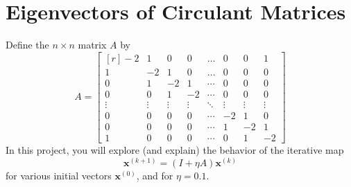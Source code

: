 \section{Eigenvectors of Circulant Matrices}


Define the $n \times n$ matrix $A$ by
\begin{equation}
A = \begin{bmatrix*}[r] -2 & 1 & 0 & 0 & \dots & 0 & 0 & 1 \\ 1 & -2 & 1 & 0 & \dots& 0 & 0 & 0 \\ 0 & 1 & -2 & 1 & \cdots&0 & 0 & 0 \\ 0 & 0 & 1 & -2 & \cdots&0 & 0 & 0 \\ \vdots & \vdots & \vdots & \vdots & \ddots & \vdots & \vdots & \vdots \\ 0 & 0 & 0 & 0 & \cdots & -2 & 1 & 0 \\ 0 & 0 & 0 & 0 & \cdots & 1 & -2 & 1\\ 1 & 0 & 0 & 0 & \cdots & 0 & 1 & -2 \end{bmatrix*}
\end{equation}
In this project, you will explore (and explain) the behavior of the iterative map
    \begin{equation}
      \label{eq:eigen-iterative}
      \bm{x}^{(k+1)} = \left(I + \eta A\right) \bm{x}^{(k)}
    \end{equation}
    for various initial vectors $\bm{x}^{(0)}$, and for $\eta = 0.1$. 

